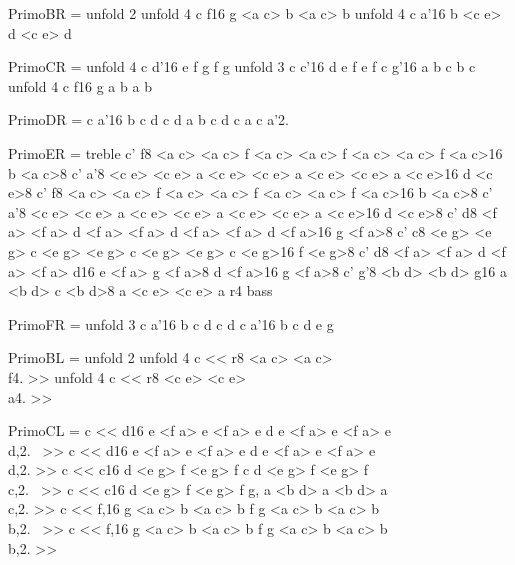 PrimoBR = {
 \repeat unfold 2 {
   \repeat unfold 4 { \relative c { f16 g <a c> b <a c> b } }
   \repeat unfold 4 { \relative c { a'16 b <c e> d <c e> d } }
 }
}

PrimoCR = {
 \repeat unfold 4 { \relative c { d'16 e f g f g } }
 \repeat unfold 3 { \relative c { c'16 d e f e f } }
 { \relative c { g'16 a b c b c } }
 \repeat unfold 4 { \relative c { f16 g a b a b } }
}

PrimoDR = {
 { \relative c { a'16 b c d c d a b c d c a } }
 { \relative c { a'2. } }
}

PrimoER = {
 \clef treble
 { \relative c' { f8 <a c> <a c> f <a c> <a c> f <a c> <a c> f <a c>16 b <a c>8 } }
 { \relative c' { a'8 <c e> <c e> a <c e> <c e> a <c e> <c e> a <c e>16 d <c e>8 } }
 { \relative c' { f8 <a c> <a c> f <a c> <a c> f <a c> <a c> f <a c>16 b <a c>8 } }
 { \relative c' { a'8 <c e> <c e> a <c e> <c e> a <c e> <c e> a <c e>16 d <c e>8 } }
 { \relative c' { d8 <f a> <f a> d <f a> <f a> d <f a> <f a> d <f a>16 g <f a>8 } }
 { \relative c' { c8 <e g> <e g> c <e g> <e g> c <e g> <e g> c <e g>16 f <e g>8 } }
 { \relative c' { d8 <f a> <f a> d <f a> <f a> d16 e <f a> g <f a>8 d <f a>16 g <f a>8 } }
 { \relative c' { g'8 <b d> <b d> g16 a <b d> c <b d>8 a <c e> <c e> a r4 } }
 \clef bass
}

PrimoFR = {
   \repeat unfold 3 { \relative c { a'16 b c d c d } }
   { \relative c { a'16 b c d e g } }
}

PrimoBL = {
 \repeat unfold 2 {
   \repeat unfold 4 { \relative c { << { r8 <a c> <a c> } \\ { f4. } >> } }
   \repeat unfold 4 { \relative c { << { r8 <c e> <c e> } \\ { a4. } >> } }
 }
}

PrimoCL = {
 { \relative c { << { d16 e <f a> e <f a> e d e <f a> e <f a> e} \\ { d,2.~ } >> } }
 { \relative c { << { d16 e <f a> e <f a> e d e <f a> e <f a> e} \\ { d,2. } >> } }
 { \relative c { << { c16 d <e g> f <e g> f c d <e g> f <e g> f} \\ { c,2.~ } >> } }
 { \relative c { << { c16 d <e g> f <e g> f g, a <b d> a <b d> a} \\ { c,2. } >> } }
 { \relative c { << { f,16 g <a c> b <a c> b f g <a c> b <a c> b} \\ { b,2.~ } >> } }
 { \relative c { << { f,16 g <a c> b <a c> b f g <a c> b <a c> b} \\ { b,2. } >> } }
}

